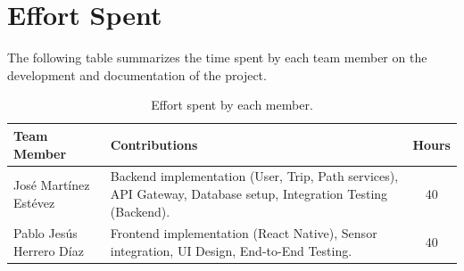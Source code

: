 \section{Effort Spent}
\label{sec:effort_spent}%

The following table summarizes the time spent by each team member on the development and documentation of the project.

\begin{table}[H]
    \centering
    \begin{tabular}{|l|p{}|c|}
        \hline
        \textbf{Team Member} & \textbf{Contributions} & \textbf{Hours} \\
        \hline
        José Martínez Estévez & Backend implementation (User, Trip, Path services), API Gateway, Database setup, Integration Testing (Backend). & 40 \\
        \hline
        Pablo Jesús Herrero Díaz & Frontend implementation (React Native), Sensor integration, UI Design, End-to-End Testing. & 40 \\
        \hline
    \end{tabular}
    \caption{Effort spent by each member.}
    \label{tab:effort_spent}
\end{table}
